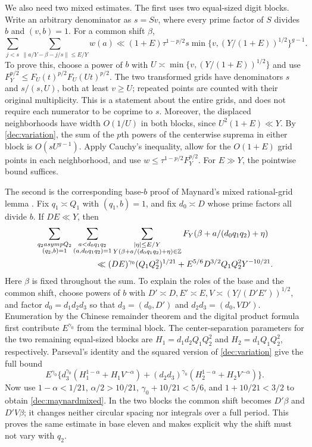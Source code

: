 \documentclass[11pt,a4paper]{article}
\theoremstyle{paperplain}
\numberwithin{equation}{section}
\begin{document}
We also need two mixed estimates. The first uses two equal-sized digit
blocks. Write an arbitrary denominator as $s=S v$, where every prime
factor of $S$ divides $b$ and $(v,b)=1$. For a common shift $\beta$,
\begin{equation}\label{dec:adaptiverow}
 \sum_{j<s}\sum_{\|a/Y-\beta-j/s\|\le E/Y}w(a)
 \ll (1+E)\tau^{1-p/2}s
 \min\{v,(Y/(1+E))^{1/2}\}^{g-1}.
\end{equation}
To prove this, choose a power of $b$ with
$U\asymp\min\{v,(Y/(1+E))^{1/2}\}$ and use
$F_Y^{p/2}\le F_U(t)^{p/2}F_U(Ut)^{p/2}$.
The two transformed grids have denominators $s$ and
$s/(s,U)$, both at least $v\ge U$; repeated points are counted with
their original multiplicity. This is a statement about the entire
grids, and does not require each numerator to be coprime to $s$.
Moreover, the displaced neighborhoods have width $O(1/U)$ in both
blocks, since $U^2(1+E)\ll Y$.
By \eqref{dec:variation}, the sum of the $p$th powers of the
centerwise suprema in either block is $O(sU^{g-1})$.
Apply Cauchy's inequality, allow for the $O(1+E)$ grid points in each
neighborhood, and use $w\le\tau^{1-p/2}F_Y^{p/2}$.
For $E\gg Y$, the pointwise bound suffices.

The second is the corresponding base-$b$ proof of Maynard's mixed
rational-grid lemma \cite[Lemma 10.7]{Maynard2019}.
Fix $q_1\asymp Q_1$ with $(q_1,b)=1$, and fix $d_0\asymp D$
whose prime factors all divide $b$. If $DE\ll Y$, then
\begin{align}
 &\sum_{\substack{q_2\asymp Q_2\\(q_2,b)=1}}
 \sum_{\substack{a<d_0q_1q_2\\(a,d_0q_1q_2)=1}}
 \sum_{\substack{|\eta|\le E/Y\\Y(\beta+a/(d_0q_1q_2)+\eta)\in\mathbb Z}}
 F_Y(\beta+a/(d_0q_1q_2)+\eta)\notag\\
 &\hspace{25mm}\ll (DE)^{\gamma_0}(Q_1Q_2^2)^{1/21}
       +E^{5/6}D^{3/2}Q_1Q_2^2Y^{-10/21}.
 \label{dec:maynardmixed}
\end{align}
Here $\beta$ is fixed throughout the sum. To explain the roles of the base
and the common shift, choose powers of $b$ with
$D'\asymp D,E'\asymp E,V\asymp(Y/(D'E'))^{1/2}$, and factor
$d_0=d_1d_2d_3$ so that $d_3=(d_0,D')$ and
$d_2d_3=(d_0,VD')$. Enumeration by the Chinese remainder theorem
and the digital product formula first contribute $E^{\gamma_0}$ from
the terminal block. The center-separation parameters for the two remaining
equal-sized blocks are $H_1=d_1d_2Q_1Q_2^2$ and $H_2=d_1Q_1Q_2^2$,
respectively. Parseval's identity and the squared version of
\eqref{dec:variation} give the full bound
\[
 E^{\gamma_0}\{d_3^{\gamma_0}(H_1^{1-\alpha}+H_1V^{-\alpha})
 +(d_2d_3)^{\gamma_0}(H_2^{1-\alpha}+H_2V^{-\alpha})\}.
\]
Now use $1-\alpha<1/21$, $\alpha/2>10/21$,
$\gamma_0+10/21<5/6$, and $1+10/21<3/2$ to obtain
\eqref{dec:maynardmixed}. In the two blocks the common shift becomes
$D'\beta$ and $D'V\beta$; it changes neither circular spacing nor integrals
over a full period. This proves the same estimate in base eleven and
makes explicit why the shift must not vary with $q_2$.
\end{document}
